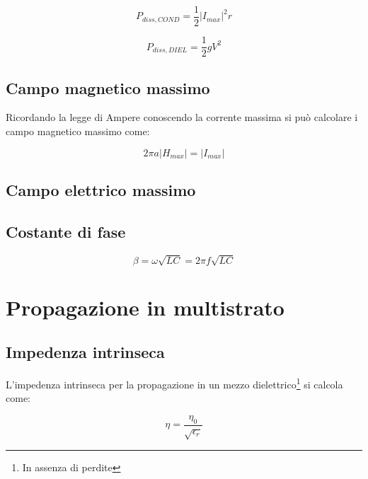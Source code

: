 \documentclass[10pt,a4paper]{report}
\begin{document}
			\begin{equation}
			P_{diss,COND}=\frac{1}{2}|I_{max}|^2 r
			\end{equation}

			\begin{equation}
			P_{diss,DIEL}=\frac{1}{2} g V^2
			\end{equation}

	\section{Campo magnetico massimo}
	
 			Ricordando la legge di Ampere conoscendo la corrente massima si può calcolare i campo magnetico massimo come:

			\begin{equation}
			2 \pi a |H_{max}| = |I_{max}|
			\end{equation}


	\section{Campo elettrico massimo}


	\section{Costante di fase}
			\begin{equation}
				\beta=\omega \sqrt{LC}=2 \pi f \sqrt{LC}
			\end{equation}
		
\chapter{Propagazione in multistrato}

	\section{Impedenza intrinseca}

		L'impedenza intrinseca per la propagazione in un mezzo dielettrico\footnote{In assenza di perdite} si calcola come:

		\begin{equation}
		\eta=\frac{\eta_0}{\sqrt{\epsilon_r}}
		\end{equation}
\end{document}
